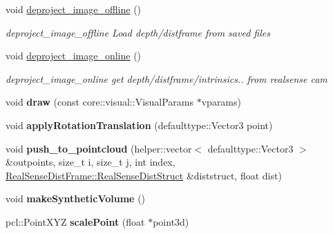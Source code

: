 \begin{DoxyCompactItemize}
\mbox{\label{classsofa_1_1rgbdtracking_1_1_real_sense_abstract_deprojector_ac0889ca4dee6e9980f9f28909d6f3ba6}} 
void \hyperlink{classsofa_1_1rgbdtracking_1_1_real_sense_abstract_deprojector_ac0889ca4dee6e9980f9f28909d6f3ba6}{deproject\+\_\+image\+\_\+offline} ()
\begin{DoxyCompactList}\small\item\em deproject\+\_\+image\+\_\+offline Load depth/distframe from saved files \end{DoxyCompactList}\item 
\mbox{\label{classsofa_1_1rgbdtracking_1_1_real_sense_abstract_deprojector_a899c0a0245338c2b771138f667d1825c}} 
void \hyperlink{classsofa_1_1rgbdtracking_1_1_real_sense_abstract_deprojector_a899c0a0245338c2b771138f667d1825c}{deproject\+\_\+image\+\_\+online} ()
\begin{DoxyCompactList}\small\item\em deproject\+\_\+image\+\_\+online get depth/distframe/intrinsics.. from realsense cam \end{DoxyCompactList}\item 
\mbox{\label{classsofa_1_1rgbdtracking_1_1_real_sense_abstract_deprojector_a6e270c7bba84a068595aa361aa3f5f3c}} 
void {\bfseries draw} (const core\+::visual\+::\+Visual\+Params $\ast$vparams)
\item 
\mbox{\label{classsofa_1_1rgbdtracking_1_1_real_sense_abstract_deprojector_ab29679f19d2215cbb05ded35d7c4d559}} 
void {\bfseries apply\+Rotation\+Translation} (defaulttype\+::\+Vector3 point)
\item 
\mbox{\label{classsofa_1_1rgbdtracking_1_1_real_sense_abstract_deprojector_ad8bc6a2a7cfe182481496dd4e10e6e42}} 
void {\bfseries push\+\_\+to\+\_\+pointcloud} (helper\+::vector$<$ defaulttype\+::\+Vector3 $>$ \&outpoints, size\+\_\+t i, size\+\_\+t j, int index, \hyperlink{structsofa_1_1rgbdtracking_1_1_real_sense_dist_frame_1_1_real_sense_dist_struct}{Real\+Sense\+Dist\+Frame\+::\+Real\+Sense\+Dist\+Struct} \&diststruct, float dist)
\item 
\mbox{\label{classsofa_1_1rgbdtracking_1_1_real_sense_abstract_deprojector_a8f8c43ae9871e46e75b3ff462af093ca}} 
void {\bfseries make\+Synthetic\+Volume} ()
\item 
\mbox{\label{classsofa_1_1rgbdtracking_1_1_real_sense_abstract_deprojector_a39b77c197afd5fe30322103da8c75b74}} 
pcl\+::\+Point\+X\+YZ {\bfseries scale\+Point} (float $\ast$point3d)
\end{DoxyCompactItemize}

